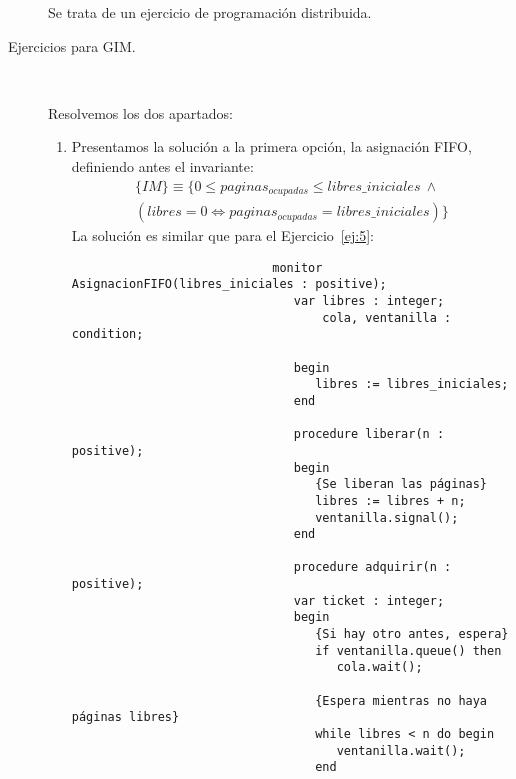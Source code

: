 \documentclass[12pt]{article}
\begin{document}
\begin{description}
            \begin{ejercicio}
                Se trata de un ejercicio de programación distribuida.
            \end{ejercicio}
        \item [Ejercicios para GIM.]~\\
            \begin{ejercicio}
                Resolvemos los dos apartados:
                \begin{enumerate}[label=(\alph*)]
                    \item Presentamos la solución a la primera opción, la asignación FIFO, definiendo antes el invariante:
                        \begin{multline*}
                            \{IM\} \equiv \{0 \leq paginas_{ocupadas} \leq libres\_iniciales\ \land \\ (libres = 0 \Longleftrightarrow paginas_{ocupadas} = libres\_iniciales)\}
                        \end{multline*}
                        La solución es similar que para el Ejercicio~\ref{ej:5}:
                        \begin{verbatim}
                            monitor AsignacionFIFO(libres_iniciales : positive);
                               var libres : integer;
                                   cola, ventanilla : condition;

                               begin
                                  libres := libres_iniciales;
                               end

                               procedure liberar(n : positive);
                               begin
                                  {Se liberan las páginas}
                                  libres := libres + n;
                                  ventanilla.signal();
                               end

                               procedure adquirir(n : positive);
                               var ticket : integer;
                               begin
                                  {Si hay otro antes, espera}
                                  if ventanilla.queue() then
                                     cola.wait();

                                  {Espera mientras no haya páginas libres}
                                  while libres < n do begin
                                     ventanilla.wait();
                                  end


\end{verbatim}
\end{enumerate}
\end{ejercicio}
\end{description}
\end{document}
